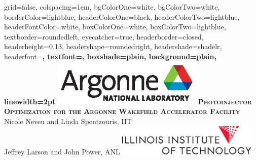 \documentclass[landscape,final,a0paper,fontscale=0.277]{baposter}
\begin{document}
\begin{poster}{
	grid=false,
	colspacing=1em,
	bgColorOne=white,
	bgColorTwo=white,
	borderColor=lightblue,
	headerColorOne=black,
	headerColorTwo=lightblue,
	headerFontColor=white,
	boxColorOne=white,
	boxColorTwo=lightblue,
	textborder=roundedleft,
	eyecatcher=true,
	headerborder=closed,
	headerheight=0.13\textheight,
	headershape=roundedright,
	headershade=shadelr,
	headerfont=\Large\bf\textsc, %
	textfont={\setlength{\parindent}{1.5em}},
	boxshade=plain,
	background=plain,
	linewidth=2pt
}
{\includegraphics[height=6em]{./logos/Argonne_cmyk_black}} 
{\bf\textsc{Photoinjector Optimization for the Argonne Wakefield Accelerator Facility}}%
{Nicole Neveu and Linda Spentzouris, IIT \\
Jeffrey Larson and John Power, ANL}
{%
\includegraphics[height=4.0em]{./logos/IIT_logo}
}


  \newcommand{\colouredcircle}[1]{%
    \tikz{\useasboundingbox (-0.2em,-0.32em) rectangle(0.2em,0.32em); \draw[draw=black,fill=baposterBGone!80!black!#1!white,line width=0.03em] (0,0) circle(0.18em);}}


\end{poster}
\end{document}
